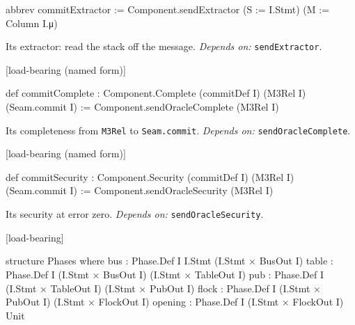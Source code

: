 \begin{leancode}
abbrev commitExtractor := Component.sendExtractor (S := I.Stmt) (M := Column I.μ)
\end{leancode}


Its extractor: read the stack off the message. \emph{Depends on:} \texttt{sendExtractor}.

\par\medskip\noindent\textbf{}\hfill\textsf{\small [load-bearing (named form)]}\par\nopagebreak

\begin{leancode}
def commitComplete : Component.Complete (commitDef I) (M3Rel I) (Seam.commit I) :=
  Component.sendOracleComplete (M3Rel I)
\end{leancode}


Its completeness from \texttt{M3Rel} to \texttt{Seam.\allowbreak{}commit}. \emph{Depends on:} \texttt{sendOracleComplete}.

\par\medskip\noindent\textbf{}\hfill\textsf{\small [load-bearing (named form)]}\par\nopagebreak

\begin{leancode}
def commitSecurity : Component.Security (commitDef I) (M3Rel I) (Seam.commit I) :=
  Component.sendOracleSecurity (M3Rel I)
\end{leancode}


Its security at error zero. \emph{Depends on:} \texttt{sendOracleSecurity}.

\par\medskip\noindent\textbf{}\hfill\textsf{\small [load-bearing]}\par\nopagebreak

\begin{leancode}
structure Phases where
  bus : Phase.Def I I.Stmt (I.Stmt × BusOut I)
  table : Phase.Def I (I.Stmt × BusOut I) (I.Stmt × TableOut I)
  pub : Phase.Def I (I.Stmt × TableOut I) (I.Stmt × PubOut I)
  flock : Phase.Def I (I.Stmt × PubOut I) (I.Stmt × FlockOut I)
  opening : Phase.Def I (I.Stmt × FlockOut I) Unit
\end{leancode}

